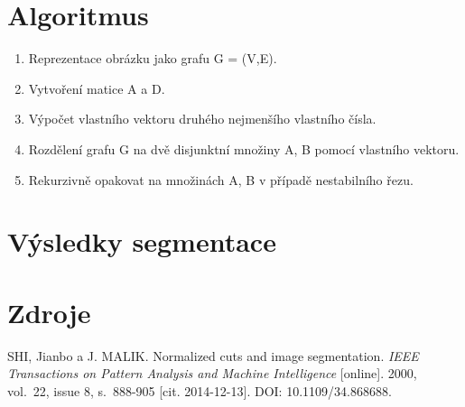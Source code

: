 \documentclass[11pt]{beamer}
\begin{document}
\section{Algoritmus}
\begin{frame}
\begin{enumerate}
\item Reprezentace obrázku jako grafu G = (V,E).
\item Vytvoření matice A a D.
\item Výpočet vlastního vektoru druhého nejmenšího vlastního čísla.
\item Rozdělení grafu G na dvě disjunktní množiny A, B pomocí vlastního vektoru.
\item Rekurzivně opakovat na množinách A, B v případě nestabilního řezu.
\end{enumerate}

\end{frame}
\section{Výsledky segmentace}
\begin{frame}

\end{frame}

\section*{Zdroje}
\begin{frame}
\begin{thebibliography}{9}
SHI, Jianbo a J. MALIK. Normalized cuts and image segmentation. \textit{IEEE Transactions on Pattern Analysis and Machine Intelligence} [online]. 2000, vol.~22, issue 8, s.~888-905 [cit. 2014-12-13]. DOI: 10.1109/34.868688. 
\end{thebibliography}
\end{frame}
\end{document}
